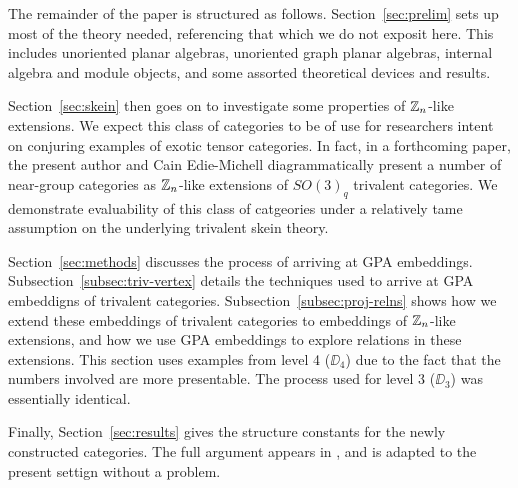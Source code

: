 The remainder of the paper is structured as follows.
Section~\ref{sec:prelim} sets up most of the theory needed, referencing that which we do not exposit here.
This includes unoriented planar algebras, unoriented graph planar algebras, 
internal algebra and module objects, and some assorted theoretical devices and results.

Section~\ref{sec:skein} then goes on to investigate some properties of $\mathbb{Z}_n$-like extensions.
We expect this class of categories to be of use for researchers intent on conjuring 
examples of exotic tensor categories.
In fact, in a forthcoming paper, the present author and Cain Edie-Michell diagrammatically
present a number of near-group categories as $\mathbb{Z}_n$-like extensions of $SO(3)_q$ trivalent categories.
We demonstrate evaluability of this class of catgeories under a relatively tame assumption on the
underlying trivalent skein theory.

Section~\ref{sec:methods} discusses the process of arriving at GPA embeddings.
Subsection~\ref{subsec:triv-vertex} details the techniques used to arrive at GPA embeddigns of 
trivalent categories. 
Subsection~\ref{subsec:proj-relns} shows how we extend these embeddings of trivalent categories
to embeddings of $\mathbb{Z}_n$-like extensions, and how we use GPA embeddings to explore 
relations in these extensions.
This section uses examples from level 4 ($\DD_4$) due to the fact that the numbers involved are more presentable.
The process used for level 3 ($\DD_3$) was essentially identical.

Finally, Section~\ref{sec:results} gives the structure constants for the newly constructed categories.
The full argument appears in \cite{cain_noah_hans}, and is adapted to the present settign without a problem.